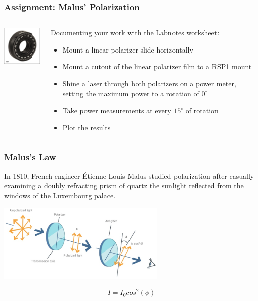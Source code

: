 \documentclass{beamer}
\begin{document}
\begin{frame}\frametitle{Assignment: Malus' Polarization}
\begin{columns}
\begin{column}{4cm}
\begin{center}
\includegraphics[width=3cm]{fig/rsp1.jpg}
\end{center}
\end{column}
\begin{column}{7cm}
Documenting your work with the Labnotes worksheet:
\begin{itemize}
\item Mount a linear polarizer slide horizontally
\item Mount a cutout of the linear polarizer film to a RSP1 mount
\item Shine a laser through both polarizers on a power meter, setting the maximum power to a rotation of $0^{\circ}$
\item Take power measurements at every $15^{\circ}$ of rotation
\item Plot the results
\end{itemize}
\end{column}
\end{columns}
\end{frame}

\begin{frame}\frametitle{Malus's Law}
In 1810, French engineer Étienne-Louis Malus studied polarization after casually examining a doubly refracting prism of quartz the sunlight reflected from the windows of the Luxembourg palace.


\begin{center}
\includegraphics[width=8cm]{fig/malus.jpg}
\end{center}

\[ I = I_0 cos^2(\phi)\]

\end{frame}
\end{document}
